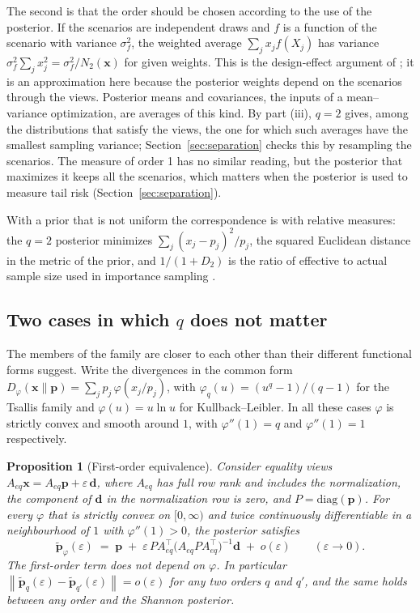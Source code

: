\documentclass[11pt]{article}
\newtheorem{proposition}{Proposition}
\newcommand{\p}{\mathbf{p}}
\newcommand{\pt}{\tilde{\mathbf{p}}}
\newcommand{\x}{\mathbf{x}}
\newcommand{\norm}[1]{\left\lVert #1 \right\rVert}
\begin{document}
The second is that the order should be chosen according to the use of
the posterior. If the scenarios are independent draws and $f$ is a function of
the scenario with variance $\sigma_f^2$, the weighted average
$\sum_j x_j f(X_j)$ has variance $\sigma_f^2 \sum_j x_j^2 = \sigma_f^2 /
N_2(\x)$ for given weights. This is the design-effect argument of
\citet{Kish1965}; it is an approximation here because the posterior weights
depend on the scenarios through the views. Posterior means and covariances,
the inputs of a mean--variance optimization, are averages of this kind. By
part (iii), $q=2$ gives, among the distributions that satisfy the views,
the one for which such averages have the smallest sampling variance;
Section~\ref{sec:separation} checks this by resampling the scenarios.
The measure of order 1 has no similar reading, but the posterior that
maximizes it keeps all the scenarios, which matters when the posterior is
used to measure tail risk (Section~\ref{sec:separation}).

With a prior that is not uniform the correspondence is with relative
measures: the $q=2$ posterior minimizes
$\sum_j (x_j - p_j)^2/p_j$, the squared Euclidean distance in the metric of the
prior, and $1/(1+D_2)$ is the ratio of effective to actual sample size used in
importance sampling \citep{KongLiuWong1994}.

\subsection{Two cases in which \texorpdfstring{$q$}{q} does not matter}

The members of the family are closer to each other than their different
functional forms suggest. Write the divergences in the common form
$D_\varphi(\x\|\p) = \sum_j p_j\, \varphi(x_j/p_j)$, with
$\varphi_q(u) = (u^q-1)/(q-1)$ for the Tsallis family and
$\varphi(u) = u \ln u$ for Kullback--Leibler. In all these cases $\varphi$
is strictly convex and smooth around $1$, with $\varphi''(1) = q$ and
$\varphi''(1)=1$ respectively.

\begin{proposition}[First-order equivalence]\label{prop:local}
Consider equality views $A_{eq}\x = A_{eq}\p + \varepsilon\,\mathbf{d}$,
where $A_{eq}$ has full row rank and includes the normalization, the
component of $\mathbf{d}$ in the normalization row is zero, and
$P = \mathrm{diag}(\p)$. For every $\varphi$ that is strictly convex on
$[0,\infty)$ and twice continuously differentiable in a neighbourhood of
$1$ with $\varphi''(1) > 0$, the posterior satisfies
\begin{equation}\label{eq:linear}
\pt_\varphi(\varepsilon) \;=\; \p \;+\; \varepsilon\, P A_{eq}^\top
\big(A_{eq} P A_{eq}^\top\big)^{-1} \mathbf{d} \;+\; o(\varepsilon)
\qquad (\varepsilon \to 0).
\end{equation}
The first-order term does not depend on $\varphi$. In particular
$\norm{\pt_q(\varepsilon) - \pt_{q'}(\varepsilon)} = o(\varepsilon)$ for any
two orders $q$ and $q'$, and the same holds between any order and the
Shannon posterior.
\end{proposition}
\end{document}
